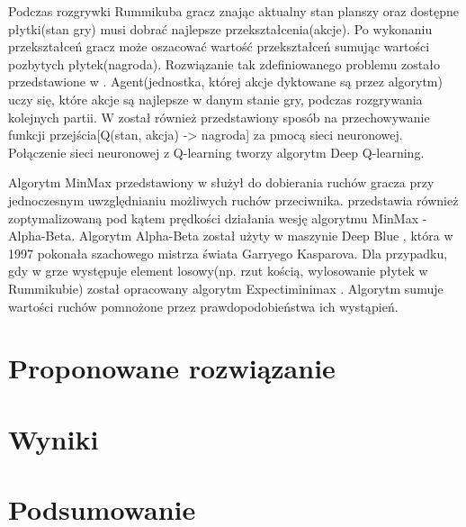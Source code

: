 \documentclass[twoside,twocolumn]{article}
\begin{document}
Podczas rozgrywki Rummikuba gracz znając aktualny stan planszy oraz dostępne płytki(stan gry) musi dobrać najlepsze 
przekształcenia(akcje). Po wykonaniu przekształceń gracz może oszacować wartość przekształceń sumując wartości pozbytych 
płytek(nagroda). Rozwiązanie tak zdefiniowanego problemu zostało przedstawione w \cite{Kaelbling:1996}. Agent(jednostka, której akcje dyktowane są przez algorytm) uczy się, które akcje są najlepsze 
w danym stanie gry, podczas rozgrywania kolejnych partii. W \cite{Kaelbling:1996} został również przedstawiony sposób na przechowywanie funkcji przejścia[Q(stan, akcja) -> nagroda] 
za pmocą sieci neuronowej. Połączenie sieci neuronowej z Q-learning tworzy algorytm Deep Q-learning.

Algorytm MinMax przedstawiony w \cite{Winston:1992} służył do dobierania ruchów gracza przy jednoczesnym uwzględnianiu możliwych ruchów przeciwnika. 
\cite{Winston:1992} przedstawia również zoptymalizowaną pod kątem prędkości działania wesję algorytmu MinMax - Alpha-Beta. Algorytm Alpha-Beta został użyty w maszynie  
Deep Blue\textsuperscript{\textregistered} \cite{Campbell:2002}, która w 1997 pokonała szachowego mistrza świata Garryego Kasparova. Dla przypadku, gdy w grze występuje 
element losowy(np. rzut kością, wylosowanie płytek w Rummikubie) został opracowany algorytm Expectiminimax \cite{Stuart:2009}. Algorytm sumuje wartości ruchów pomnożone 
przez prawdopodobieństwa ich wystąpień.

\section{Proponowane rozwiązanie}
\section{Wyniki}

\section{Podsumowanie}




\end{document}
